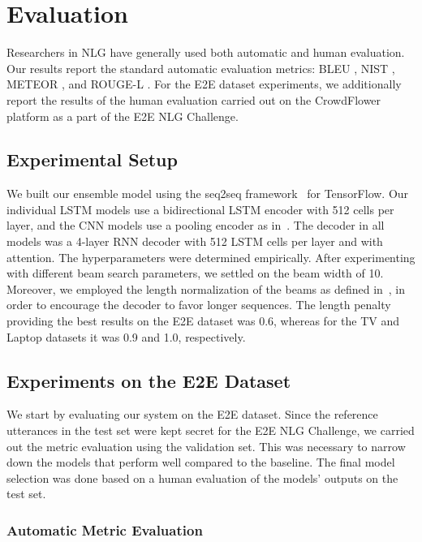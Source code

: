 \documentclass[11pt,a4paper]{article}
\begin{document}
\section{Evaluation}
\label{sec:evaluation}


Researchers in NLG have generally used both automatic and human evaluation. Our results report the standard automatic evaluation metrics: BLEU \cite{papineni2002bleu}, NIST \cite{przybocki2009nist}, METEOR \cite{lavie2007meteor}, and ROUGE-L \cite{lin2004rouge}. For the E2E dataset experiments, we additionally report the results of the human evaluation carried out on the CrowdFlower platform as a part of the E2E NLG Challenge.


\subsection{Experimental Setup}

We built our ensemble model using the seq2seq framework~\cite{britz2017massive} for TensorFlow. Our individual LSTM models use a bidirectional LSTM encoder with 512 cells per layer, and the CNN models use a pooling encoder as in~\citet{gehring2017convolutional}. The decoder in all models was a 4-layer RNN decoder with 512 LSTM cells per layer and with attention. The hyperparameters were determined empirically. After experimenting with different beam search parameters, we settled on the beam width of 10. Moreover, we employed the length normalization of the beams as defined in~\citet{wu2016google}, in order to encourage the decoder to favor longer sequences. The length penalty providing the best results on the E2E dataset was 0.6, whereas for the TV and Laptop datasets it was 0.9 and 1.0, respectively.




\subsection{Experiments on the E2E Dataset}

We start by evaluating our system on the E2E dataset. Since the reference utterances in the test set were kept secret for the E2E NLG Challenge, we carried out the metric evaluation using the validation set. This was necessary to narrow down the models that perform well compared to the baseline. The final model selection was done based on a human evaluation of the models' outputs on the test set.

\subsubsection{Automatic Metric Evaluation}
\end{document}
